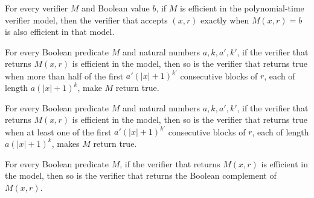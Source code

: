 \begin{theorem}
\label{Randomized.polyTimeModel_closedUnderAnswerIs}
\leanok
{}
For every verifier $M$ and Boolean value $b$, if $M$ is efficient in the polynomial-time
verifier model, then the verifier that accepts $(x,r)$ exactly when $M(x,r)=b$ is also
efficient in that model.
\end{theorem}

\begin{theorem}
\label{Randomized.polyTimeModel_closedUnderMajority}
\leanok
{}
For every Boolean predicate $M$ and natural numbers $a,k,a',k'$, if the verifier that
returns $M(x,r)$ is efficient in the model, then so is the verifier that returns true
when more than half of the first $a'(|x|+1)^{k'}$ consecutive blocks of $r$, each of
length $a(|x|+1)^k$, make $M$ return true.
\end{theorem}

\begin{theorem}
\label{Randomized.polyTimeModel_closedUnderAny}
\leanok
{}
For every Boolean predicate $M$ and natural numbers $a,k,a',k'$, if the verifier that
returns $M(x,r)$ is efficient in the model, then so is the verifier that returns true
when at least one of the first $a'(|x|+1)^{k'}$ consecutive blocks of $r$, each of
length $a(|x|+1)^k$, makes $M$ return true.
\end{theorem}

\begin{theorem}
\label{Randomized.polyTimeModel_closedUnderNot}
\leanok
{}
For every Boolean predicate $M$, if the verifier that returns $M(x,r)$ is efficient in
the model, then so is the verifier that returns the Boolean complement of $M(x,r)$.
\end{theorem}

